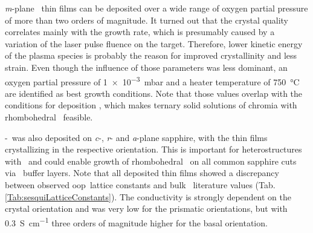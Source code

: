 \textit{m}-plane \cro\ thin films can be deposited over a wide range of oxygen partial pressure of more than two orders of magnitude.
It turned out that the crystal quality correlates mainly with the growth rate, which is presumably caused by a variation of the laser pulse fluence on the target.
Therefore, lower kinetic energy of the plasma species is probably the reason for improved crystallinity and less strain.
Even though the influence of those parameters was less dominant, an oxygen partial pressure of \qty{1e-3}{\milli\bar} and a heater temperature of \qty{750}{\degreeCelsius} are identified as best growth conditions.
Note that those values overlap with the conditions for deposition \agao, which makes ternary solid solutions of chromia with rhombohedral \gao\ feasible.

\textalpha-\cro\ was also deposited on \textit{c}-, \textit{r}- and \textit{a}-plane sapphire, with the thin films crystallizing in the respective orientation.
This is important for heterostructures with \agao\ and could enable growth of rhombohedral \gao\ on all common sapphire cuts via \cro\ buffer layers.
Note that all deposited thin films showed a discrepancy between observed \gls{oop}\ lattice constants and bulk \cro\ literature values (Tab.\,\ref{Tab:sesquiLatticeConstants}).
The conductivity is strongly dependent on the crystal orientation and was very low for the prismatic orientations, but with \qty{0.3}{\siemens\per\cm} three orders of magnitude higher for the basal orientation.